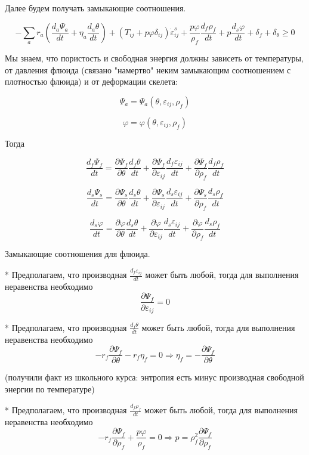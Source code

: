 \documentclass[main.tex]{subfiles}
\begin{document}
Далее будем получать замыкающие соотношения.

$$-\sum\limits_a{r_a\left(\frac{d_a\Psi_a}{dt}+\eta_a\frac{d_a\theta}{dt}\right)}+\left(T_{ij}+p\varphi\delta_{ij}\right)\dot{\varepsilon}_{ij}^s+\frac{p\varphi}{\rho_f}\frac{d_f\rho_f}{dt}+p\frac{d_s\varphi}{dt}+\delta_f+\delta_\theta\geq 0$$

Мы знаем, что пористость и свободная энергия должны зависеть от температуры, от давления флюида (связано "намертво" неким замыкающим соотношением с плотностью флюида) и от деформации скелета:

$$\Psi_a=\Psi_a\left(\theta,\varepsilon_{ij},\rho_f\right)$$

$$\varphi=\varphi\left(\theta,\varepsilon_{ij},\rho_f\right)$$

Тогда

$$\frac{d_f\Psi_f}{dt}=\frac{\partial\Psi_f}{\partial\theta}\frac{d_f\theta}{dt}+\frac{\partial\Psi_f}{\partial \varepsilon_{ij}}\frac{d_f\varepsilon_{ij}}{dt}+\frac{\partial\Psi_f}{\partial\rho_f}\frac{d_f\rho_f}{dt}$$

$$\frac{d_s\Psi_s}{dt}=\frac{\partial\Psi_s}{\partial\theta}\frac{d_s\theta}{dt}+\frac{\partial\Psi_s}{\partial \varepsilon_{ij}}\frac{d_s\varepsilon_{ij}}{dt}+\frac{\partial\Psi_s}{\partial\rho_f}\frac{d_s\rho_f}{dt}$$

$$\frac{d_s\varphi}{dt}=\frac{\partial\varphi}{\partial\theta}\frac{d_s\theta}{dt}+\frac{\partial\varphi}{\partial \varepsilon_{ij}}\frac{d_s\varepsilon_{ij}}{dt}+\frac{\partial\varphi}{\partial\rho_f}\frac{d_s\rho_f}{dt}$$

Замыкающие соотношения для флюида.

* Предполагаем, что производная $\displaystyle{}\frac{d_f\varepsilon_{ij}}{dt}$ может быть любой, тогда для выполнения неравенства необходимо $$\frac{\partial\Psi_f}{\partial\varepsilon_{ij}}=0$$

* Предполагаем, что производная $\displaystyle{}\frac{d_f\theta}{dt}$ может быть любой, тогда для выполнения неравенства необходимо $$-r_f\frac{\partial\Psi_f}{\partial\theta}-r_f\eta_f=0\Rightarrow\eta_f=-\frac{\partial\Psi_f}{\partial\theta}$$

(получили факт из школьного курса: энтропия есть минус производная свободной энергии по температуре)

* Предполагаем, что производная $\displaystyle{}\frac{d_f\rho_f}{dt}$ может быть любой, тогда для выполнения неравенства необходимо $$-r_f\frac{\partial\Psi_f}{\partial\rho_f}+\frac{p\varphi}{\rho_f}=0\Rightarrow p=\rho_f^2\frac{\partial\Psi_f}{\partial\rho_f}$$
\end{document}
